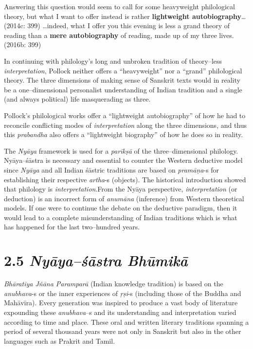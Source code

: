 \begin{myquote}
Answering this question would seem to call for some heavyweight philological theory, but what I want to offer instead is rather \textbf{lightweight autobiography}… (2014c: 399) …indeed, what I offer you this evening is less a grand theory of reading than a \textbf{mere autobiography} of reading, made up of my three lives. (2016b: 399)
\end{myquote}

In continuing with philology’s long and unbroken tradition of theory–less \textit{interpretation}, Pollock neither offers a “heavyweight” nor a “grand” philological theory. The three dimensions of making sense of Sanskrit texts would in reality be a one–dimensional personalist understanding of Indian tradition and a single (and always political) life masquerading as three.

Pollock’s philological works offer a “lightweight autobiography” of how he had to reconcile conflicting modes of \textit{interpretation} along the three dimensions, and thus this \textit{prabandha} also offers a “lightweight biography” of how he does so in reality.

The \textit{Nyāya} framework is used for a \textit{parīkṣā }of the three–dimensional philology. Nyāya–śāstra is necessary and essential to counter the Western deductive model since \textit{Nyāya} and all Indian śāstric traditions are based on \textit{pramāṇa}-s for establishing their respective \textit{artha}-s (objects). The historical introduction showed that philology is \textit{interpretation}.\break From the Nyāya perspective, \textit{interpretation }(or deduction) is an incorrect form of \textit{anumāna} (inference) from Western theoretical models. If one were to continue the debate on the deductive paradigm, then it would lead to a complete misunderstanding of Indian traditions which is what has happened for the last two–hundred years.

\vspace{-.3cm}

\section*{2.5 {\it {\bfseries Nyāya–śāstra Bhūmikā}}}

\vspace{-.2cm}

\textit{Bhāratīya Jñāna Paramparā} (Indian knowledge tradition) is based on the \textit{anubhava}-s or the inner experiences of \textit{ṛṣi}-s (including those of the Buddha and Mahāvīra). Every generation was inspired to produce a vast body of literature expounding these \textit{anubhava}–s and its understanding and interpretation varied according to time and place. These oral and written literary traditions spanning a period of several thousand years were not only in Sanskrit but also in the other languages such as Prakrit and Tamil.

